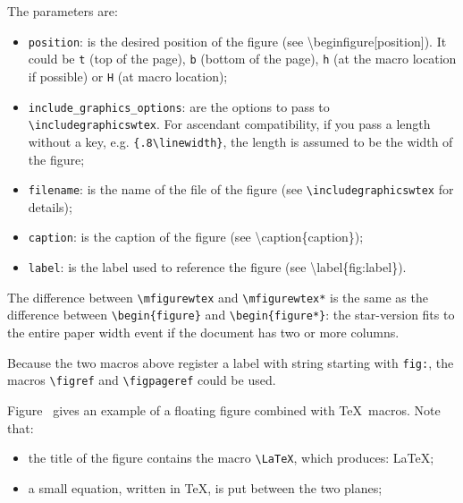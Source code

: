 \documentclass[book]{upmethodology-document}
\begin{document}
The parameters are:
\begin{itemize}
\item \texttt{position}: is the desired position of the figure (see {\textbackslash}begin{figure}[position]). It could be \texttt{t} (top of the page), \texttt{b} (bottom of the page), \texttt{h} (at the macro location if possible) or \texttt{H} (at macro location);

\item \texttt{include\_graphics\_options}: are the options to pass to \texttt{{\textbackslash}includegraphicswtex}. For ascendant compatibility, if you pass a length without a key, e.g. \texttt{\{.8{\textbackslash}linewidth\}}, the length is assumed to be the width of the figure;

\item \texttt{filename}: is the name of the file of the figure (see \texttt{{\textbackslash}includegraphicswtex} for details);

\item \texttt{caption}: is the caption of the figure (see {\textbackslash}caption\{caption\});

\item \texttt{label}: is the label used to reference the figure (see {\textbackslash}label\{fig:label\}).
\end{itemize}

The difference between \texttt{{\textbackslash}mfigurewtex} and \texttt{{\textbackslash}mfigurewtex*} is the same as the difference between \texttt{{\textbackslash}begin\{figure\}} and \texttt{{\textbackslash}begin\{figure*\}}: the star-version fits to the entire paper width event if the document has two or more columns.

Because the two macros above register a label with string starting with \texttt{fig:}, the macros \texttt{{\textbackslash}figref} and \texttt{{\textbackslash}figpageref} could be used.


Figure~ gives an example of a floating figure combined with \TeX\ macros. Note that:
\begin{itemize}
\item the title of the figure contains the macro \texttt{{\textbackslash}LaTeX}, which produces: \LaTeX;
\item a small equation, written in \TeX, is put between the two planes;
\end{itemize}
\end{document}
